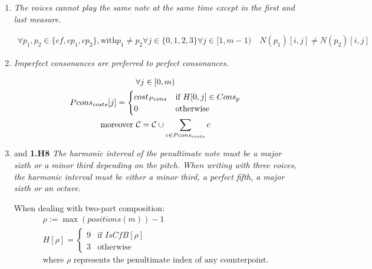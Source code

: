 \begin{enumerate}[wide, label=\bfseries 1.H\arabic*]
\item\label{rule:no-unison-appendix}{\textit{The voices cannot play the same note at the same time except in the first and last measure.}}

\begin{equation}
    \begin{gathered}
        \forall p_1, p_2 \in \{cf, cp_1, cp_2\}, \text{with} p_1 \neq p_2 \forall j \in \{0, 1, 2, 3\} \forall j \in [1, m-1) \quad
        N(p_1)[i, j] \neq N(p_2)[i, j]
    \end{gathered}
\end{equation}

\item \label{rule:prefer-imp-to-perf-appendix}{\textit{Imperfect consonances are preferred to perfect consonances.}}


\begin{equation}
    \begin{gathered}
        \forall j \in [0, m)\\
        Pcons_{costs}[j] = \begin{cases}
            cost_{Pcons} & \text{if } H[0, j] \in Cons_{p}\\
            0 & \text{otherwise}
        \end{cases}\\
        \text{moreover } \mathcal{C} = \mathcal{C} \cup \sum _{c \in Pcons_{costs}} c
    \end{gathered}
\end{equation}

\item{and \textbf{1.H8} \textit{The harmonic interval of the penultimate note must be a major sixth or a minor third depending on the \cfs pitch. When writing with three voices, the harmonic interval must be either a minor third, a perfect fifth, a major sixth or an octave.}}\label{rule:penult-interval-2v}
\addtocounter{enumi}{1} 
When dealing with two-part composition:
\begin{equation}
    \begin{gathered}
        \rho := \max (positions(m)) - 1\\
        H[\rho] = \begin{cases}
            9 & \text{if } IsCfB[\rho]\\
            3 & \text{otherwise}
        \end{cases}\\
        \text{where } \rho \text{ represents the penultimate index of any counterpoint.}
    \end{gathered}
\end{equation}


\end{enumerate}
